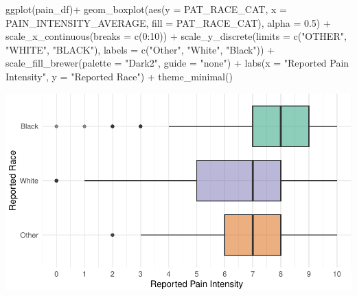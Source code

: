 \documentclass[
  letterpaper,
]{latex/krantz}
\makeatletter
\newenvironment{Shaded}{\begin{snugshade}}{\end{snugshade}}
\newcommand{\AttributeTok}[1]{\textcolor[rgb]{0.40,0.45,0.13}{#1}}
\newcommand{\DecValTok}[1]{\textcolor[rgb]{0.68,0.00,0.00}{#1}}
\newcommand{\FloatTok}[1]{\textcolor[rgb]{0.68,0.00,0.00}{#1}}
\newcommand{\FunctionTok}[1]{\textcolor[rgb]{0.28,0.35,0.67}{#1}}
\newcommand{\NormalTok}[1]{\textcolor[rgb]{0.00,0.23,0.31}{#1}}
\newcommand{\SpecialCharTok}[1]{\textcolor[rgb]{0.37,0.37,0.37}{#1}}
\newcommand{\StringTok}[1]{\textcolor[rgb]{0.13,0.47,0.30}{#1}}
\newenvironment{kframe}{%
\medskip{}
\setlength{\fboxsep}{.8em}
 \def\at@end@of@kframe{}%
 \ifinner\ifhmode%
  \def\at@end@of@kframe{\end{minipage}}%
  \begin{minipage}{\columnwidth}%
 \fi\fi%
 \def\FrameCommand##1{\hskip\@totalleftmargin \hskip-\fboxsep
 \colorbox{shadecolor}{##1}\hskip-\fboxsep
     \hskip-\linewidth \hskip-\@totalleftmargin \hskip\columnwidth}%
 \MakeFramed {\advance\hsize-\width
   \@totalleftmargin\z@ \linewidth\hsize
   \@setminipage}}%
 {\par\unskip\endMakeFramed%
 \at@end@of@kframe}
\renewenvironment{Shaded}{\begin{kframe}}{\end{kframe}}
\makeatother
\begin{document}
\begin{Shaded}
\begin{Highlighting}[]
\FunctionTok{ggplot}\NormalTok{(pain\_df)}\SpecialCharTok{+}
  \FunctionTok{geom\_boxplot}\NormalTok{(}\FunctionTok{aes}\NormalTok{(}\AttributeTok{y =}\NormalTok{ PAT\_RACE\_CAT, }\AttributeTok{x =}\NormalTok{ PAIN\_INTENSITY\_AVERAGE, }
                   \AttributeTok{fill =}\NormalTok{ PAT\_RACE\_CAT), }\AttributeTok{alpha =} \FloatTok{0.5}\NormalTok{) }\SpecialCharTok{+}
  \FunctionTok{scale\_x\_continuous}\NormalTok{(}\AttributeTok{breaks =} \FunctionTok{c}\NormalTok{(}\DecValTok{0}\SpecialCharTok{:}\DecValTok{10}\NormalTok{)) }\SpecialCharTok{+}
  \FunctionTok{scale\_y\_discrete}\NormalTok{(}\AttributeTok{limits =} \FunctionTok{c}\NormalTok{(}\StringTok{"OTHER"}\NormalTok{, }\StringTok{"WHITE"}\NormalTok{, }\StringTok{"BLACK"}\NormalTok{), }
                   \AttributeTok{labels =} \FunctionTok{c}\NormalTok{(}\StringTok{"Other"}\NormalTok{, }\StringTok{"White"}\NormalTok{, }\StringTok{"Black"}\NormalTok{)) }\SpecialCharTok{+}
  \FunctionTok{scale\_fill\_brewer}\NormalTok{(}\AttributeTok{palette =} \StringTok{"Dark2"}\NormalTok{, }\AttributeTok{guide =} \StringTok{"none"}\NormalTok{) }\SpecialCharTok{+}
  \FunctionTok{labs}\NormalTok{(}\AttributeTok{x =} \StringTok{"Reported Pain Intensity"}\NormalTok{, }\AttributeTok{y =} \StringTok{"Reported Race"}\NormalTok{) }\SpecialCharTok{+}
  \FunctionTok{theme\_minimal}\NormalTok{()}
\end{Highlighting}
\end{Shaded}

\begin{center}
\includegraphics[width=1\textwidth,height=\textheight]{book/visualization_ggplot_files/figure-pdf/unnamed-chunk-13-1.pdf}
\end{center}
\end{document}
